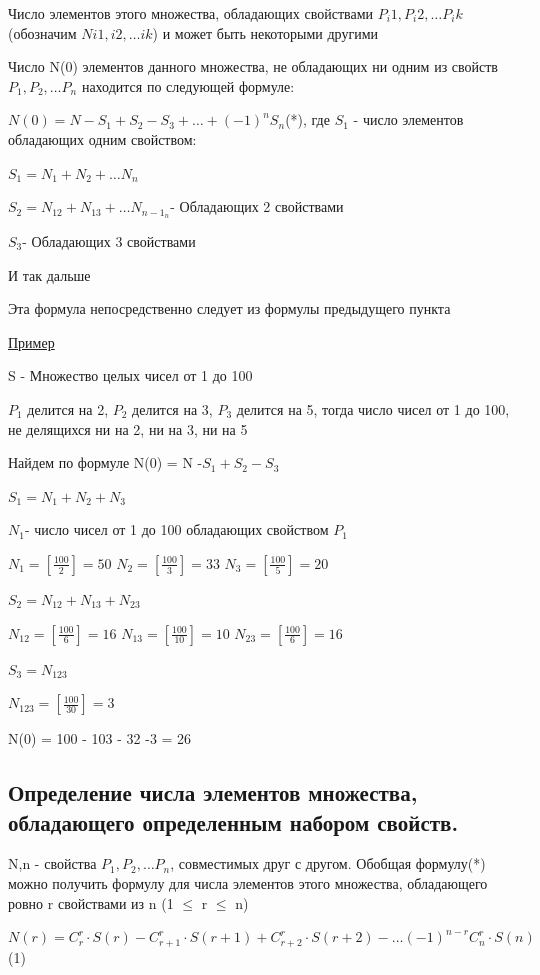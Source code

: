 \documentclass[12pt, a4paper]{article}
\begin{document}
Число элементов этого множества, обладающих свойствами $P_i1,P_i2,\dots P_ik$(обозначим $N i1,i2,\dots ik$) и может быть некоторыми другими

Число N(0) элементов данного множества, не обладающих ни одним из свойств $P_1,P_2, \dots P_n$ находится по следующей формуле:

$N(0)= N - S_1 + S_2 - S_3 + \dots +(-1)^n S_n$(*), где 
$S_1$
- число элементов обладающих одним свойством:

$S_1 = N_1 + N_2 + \dots N_n$

$S_2 = N_12 + N_13 + \dots N_{{n-1}_n}$- Обладающих 2 свойствами

$S_3$- Обладающих 3 свойствами

И так дальше

Эта формула непосредственно следует из формулы предыдущего пункта

\underline{Пример}

S - Множество целых чисел от 1 до 100 

$P_1$ делится на 2, $P_2$ делится на 3, $P_3$ делится на 5, тогда число чисел от 1 до 100, не делящихся ни на 2, ни на 3, ни на 5

Найдем по формуле N(0) = N -$S_1 + S_2 - S_3$

$S_1 = N_1 + N_2 + N_3$

$N_1 $- число чисел от 1 до 100 обладающих свойством $P_1$



$N_1 = [\frac{100}{2}]=50$
$N_2 = [\frac{100}{3}]=33$
$N_3 = [\frac{100}{5}]=20$

$S_2 = N_12 + N_13 + N_23$

$N_12 =[\frac{100}{6}]=16$ 
$N_13 =[\frac{100}{10}]=10$
$N_23 =[\frac{100}{6}]=16$

$S_3 = N_123$

$N_123 = [\frac{100}{30}] = 3$

N(0) = 100 - 103 - 32 -3 = 26
\subsection{Определение числа элементов множества, обладающего определенным набором свойств.}

N,n - свойства $P_1,P_2,\dots P_n$, совместимых друг с другом. Обобщая формулу(*) можно получить формулу для числа элементов этого множества, обладающего ровно r свойствами из n (1 $\leq$ r $\leq$ n)

$N(r)= C_r^r \cdot S(r) - C_{r+1}^r \cdot S(r+1) + C_{r+2}^r \cdot S(r+2)- \dots (-1)^{n-r} C_n^r \cdot S(n)$ (1)
\end{document}
